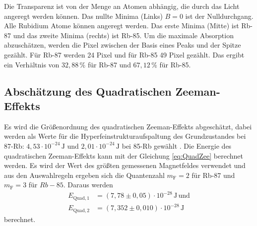 Die Transparenz ist von der Menge an Atomen abhängig, die durch das Licht angeregt werden können.
Das nullte Minima (Links) $B = 0$ ist der Nulldurchgang.
Alle Rubidium Atome können angeregt werden.
Das erste Minima (Mitte) ist Rb-87 und das zweite Minima (rechts) ist Rb-85.
Um die maximale Absorption abzuschätzen, werden die Pixel zwischen der Basis eines Peaks und der Spitze gezählt.
Für Rb-87 werden 24 Pixel und für Rb-85 49 Pixel gezählt.
Das ergibt ein Verhältnis von $32,88\, \%$ für Rb-87 und $67,12 \, \% $ für Rb-85.

\subsection{Abschätzung des Quadratischen Zeeman-Effekts}

Es wird die Größenordnung des quadratischen Zeeman-Effekts abgeschätzt, 
dabei werden als Werte für die Hyperfeinstrukturaufspaltung des Grundzustandes bei 87-Rb: $4,53 \cdot 10^{-24} \, \unit{\joule} $ und $2,01 \cdot 10^{-24} \, \unit{\joule}$ bei  85-Rb  gewählt \cite{v21}.
Die Energie des quadratischen Zeeman-Effekts kann mit der Gleichung \eqref{eq:QuadZee} berechnet werden.
Es wird der Wert des größten gemessenen Magnetfeldes verwendet und aus den Auswahlregeln ergeben sich die Quantenzahl $m_\text{F} = 2$ für Rb-87 und $m_\text{F} = 3$ für $Rb-85$.
Daraus werden 
\begin{align*}
    E_{\text{Quad},1} &= \left(7,78  \pm 0,05 \right)   \cdot 10^{-28} \, \unit{\joule} \, \text{und} \\
    E_{\text{Quad},2} &= \left(7,352 \pm 0,010 \right) \cdot 10^{-28} \, \unit{\joule}
\end{align*}
berechnet.